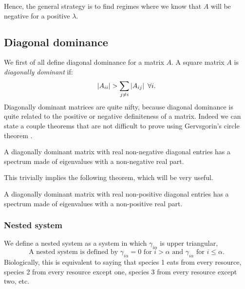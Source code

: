 \documentclass[12pt, titlepage]{report}
\begin{document}
	Hence, the general strategy is to find regimes where we know that $A$ will be negative for a positive $\lambda$.
		\subsection{Diagonal dominance}
		We first of all define diagonal dominance for a matrix $A$. A square matrix $A$ is \textit{diagonally dominant} if:
		\begin{equation}
			\abs{A_{ii}} >  \sum_{j\neq i} \abs{A_{ij}} \ \forall i.
		\end{equation}
		Diagonally dominant matrices are quite nifty, because diagonal dominance is quite related to the positive or negative definiteness of a matrix. Indeed we can state a couple theorems that are not difficult to prove using Gervsgorin's circle theorem \cite{CircleTheorem}.
		\begin{theorem}
			A diagonally dominant matrix with real non-negative diagonal entries has a spectrum made of eigenvalues with a non-negative real part.
		\end{theorem}
		This trivially implies the following theorem, which will be very useful.
		\begin{theorem}
			A diagonally dominant matrix with real non-positive diagonal entries has a spectrum made of eigenvalues with a non-positive real part.\label{thm : dd real np}
		\end{theorem}

			\subsubsection{Nested system}
			We define a nested system as a system in which $\gamma_{i\alpha}$ is upper triangular, \ie
			\begin{equation}
				\boxed{\text{A nested system is defined by }\gamma_{i\alpha}=0 \text{ for } i > \alpha \text{ and } \gamma_{i\alpha} \text{ for }i \leq \alpha.}
			\end{equation}
			Biologically, this is equivalent to saying that species 1 eats from every resource, species 2 from every resource except one, species 3 from every resource except two, etc.\\

			\\
\end{document}
